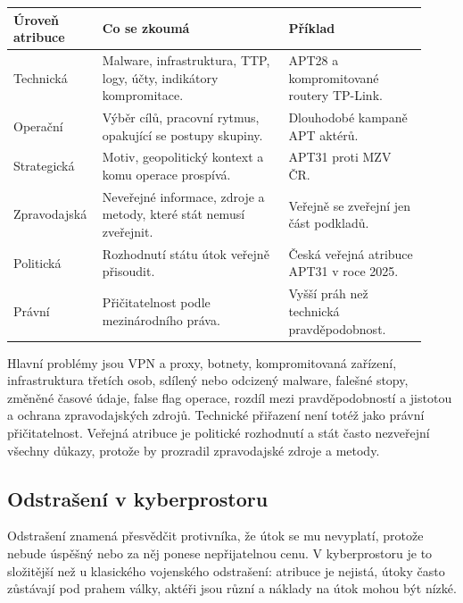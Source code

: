 \begin{longtable}{p{0.17\linewidth}p{0.43\linewidth}p{0.32\linewidth}}
\toprule
\textbf{Úroveň atribuce} & \textbf{Co se zkoumá} & \textbf{Příklad}\\
\midrule
Technická & Malware, infrastruktura, TTP, logy, účty, indikátory kompromitace. & APT28 a kompromitované routery TP-Link.\\
Operační & Výběr cílů, pracovní rytmus, opakující se postupy skupiny. & Dlouhodobé kampaně APT aktérů.\\
Strategická & Motiv, geopolitický kontext a komu operace prospívá. & APT31 proti MZV ČR.\\
Zpravodajská & Neveřejné informace, zdroje a metody, které stát nemusí zveřejnit. & Veřejně se zveřejní jen část podkladů.\\
Politická & Rozhodnutí státu útok veřejně přisoudit. & Česká veřejná atribuce APT31 v roce 2025.\\
Právní & Přičitatelnost podle mezinárodního práva. & Vyšší práh než technická pravděpodobnost.\\
\bottomrule
\end{longtable}

Hlavní problémy jsou VPN a proxy, botnety, kompromitovaná zařízení, infrastruktura třetích osob, sdílený nebo odcizený malware, falešné stopy, změněné časové údaje, false flag operace, rozdíl mezi pravděpodobností a jistotou a ochrana zpravodajských zdrojů. Technické přiřazení není totéž jako právní přičitatelnost. Veřejná atribuce je politické rozhodnutí a stát často nezveřejní všechny důkazy, protože by prozradil zpravodajské zdroje a metody.


\subsection*{Odstrašení v kyberprostoru}
Odstrašení znamená přesvědčit protivníka, že útok se mu nevyplatí, protože nebude úspěšný nebo za něj ponese nepřijatelnou cenu. V kyberprostoru je to složitější než u klasického vojenského odstrašení: atribuce je nejistá, útoky často zůstávají pod prahem války, aktéři jsou různí a náklady na útok mohou být nízké.

